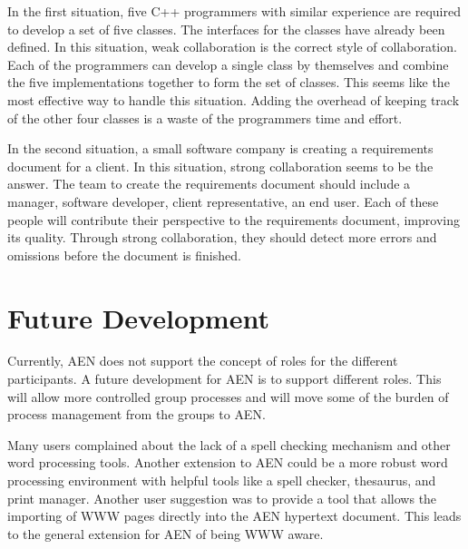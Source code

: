 In the first situation, five C++ programmers with similar experience are
required to develop a set of five classes.  The interfaces for the classes
have already been defined.  In this situation, weak collaboration is the
correct style of collaboration.  Each of the programmers can develop a
single class by themselves and combine the five implementations together to
form the set of classes.  This seems like the most effective way to handle
this situation.  Adding the overhead of keeping track of the other four
classes is a waste of the programmers time and effort.

In the second situation, a small software company is creating a
requirements document for a client.  In this situation, strong
collaboration seems to be the answer.  The team to create the requirements
document should include a manager, software developer, client
representative, an end user.  Each of these people will contribute their
perspective to the requirements document, improving its quality.  Through
strong collaboration, they should detect more errors and omissions before
the document is finished.

\section{Future Development}
\label{sec:development}

Currently, AEN does not support the concept of roles for the different
participants.  A future development for AEN is to support different roles.
This will allow more controlled group processes and will move some of the
burden of process management from the groups to AEN.

Many users complained about the lack of a spell checking mechanism and
other word processing tools.  Another extension to AEN could be a more
robust word processing environment with helpful tools like a spell checker,
thesaurus, and print manager.  Another user suggestion was to provide a
tool that allows the importing of WWW pages directly into the AEN hypertext
document.  This leads to the general extension for AEN of being WWW aware.


